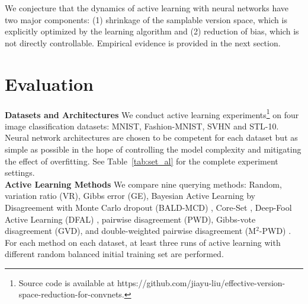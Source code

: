 \documentclass[runningheads, envcountsame, a4paper]{llncs}
\begin{document}
We conjecture that the dynamics of active learning with neural networks have two major components: (1) shrinkage of the samplable version space, which is explicitly optimized by the learning algorithm and (2) reduction of bias, which is not directly controllable. Empirical evidence is provided in the next section.




\section{Evaluation}
\label{sec:evaluation}
\noindent\textbf{Datasets and Architectures} 
We conduct active learning experiments\footnote{Source code is available at https://github.com/jiayu-liu/effective-version-space-reduction-for-convnets.} on four image classification datasets: MNIST, Fashion-MNIST, SVHN and STL-10.
Neural network architectures are chosen to be competent for each dataset but as simple as possible in the hope of controlling the model complexity and mitigating the effect of overfitting.
See Table~\ref{tab:set_al} for the complete experiment settings. \\

\noindent\textbf{Active Learning Methods} 
We compare nine querying methods: Random, variation ratio (VR), Gibbs error (GE), Bayesian Active Learning by Disagreement with Monte Carlo dropout (BALD-MCD) \cite{Houlsby11,Gal17}, Core-Set \cite{Sener18}, Deep-Fool Active Learning (DFAL) \cite{Ducoffe18}, pairwise disagreement (PWD), Gibbs-vote disagreement (GVD), and double-weighted pairwise disagreement (M$^2$-PWD) \cite{Tosh17}. For each method on each dataset, at least three runs of active learning with different random balanced initial training set are performed. \\

\begin{table*}[b]
\caption{Settings for each dataset used in the active learning experiments.}
\begin{center}
\end{center}
\label{tab:set_al}
\end{table*}
\end{document}
